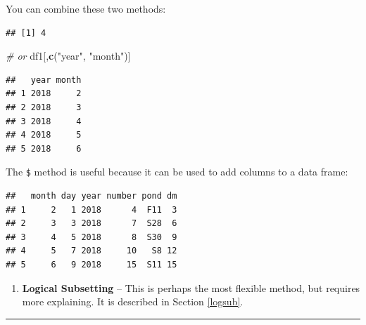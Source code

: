 \documentclass[]{book}
\newenvironment{Shaded}{\begin{snugshade}}{\end{snugshade}}
\newcommand{\KeywordTok}[1]{\textcolor[rgb]{0.13,0.29,0.53}{\textbf{#1}}}
\newcommand{\DecValTok}[1]{\textcolor[rgb]{0.00,0.00,0.81}{#1}}
\newcommand{\StringTok}[1]{\textcolor[rgb]{0.31,0.60,0.02}{#1}}
\newcommand{\CommentTok}[1]{\textcolor[rgb]{0.56,0.35,0.01}{\textit{#1}}}
\newcommand{\OperatorTok}[1]{\textcolor[rgb]{0.81,0.36,0.00}{\textbf{#1}}}
\newcommand{\NormalTok}[1]{#1}
\providecommand{\tightlist}{%
  \setlength{\itemsep}{0pt}\setlength{\parskip}{0pt}}
\theoremstyle{definition}
\theoremstyle{definition}
\theoremstyle{definition}
\theoremstyle{remark}
\begin{document}
You can combine these two methods:

\begin{Shaded}
\end{Shaded}

\begin{verbatim}
## [1] 4
\end{verbatim}

\begin{Shaded}
\begin{Highlighting}[]
\CommentTok{# or}
\NormalTok{df1[,}\KeywordTok{c}\NormalTok{(}\StringTok{"year"}\NormalTok{, }\StringTok{"month"}\NormalTok{)]}
\end{Highlighting}
\end{Shaded}

\begin{verbatim}
##   year month
## 1 2018     2
## 2 2018     3
## 3 2018     4
## 4 2018     5
## 5 2018     6
\end{verbatim}

The \texttt{\$} method is useful because it can be used to add columns
to a data frame:

\begin{Shaded}
\end{Shaded}

\begin{verbatim}
##   month day year number pond dm
## 1     2   1 2018      4  F11  3
## 2     3   3 2018      7  S28  6
## 3     4   5 2018      8  S30  9
## 4     5   7 2018     10   S8 12
## 5     6   9 2018     15  S11 15
\end{verbatim}

\begin{enumerate}
\def\labelenumi{\arabic{enumi}.}
\setcounter{enumi}{2}
\tightlist
\item
  \textbf{Logical Subsetting} -- This is perhaps the most flexible
  method, but requires more explaining. It is described in Section
  \ref{logsub}.
\end{enumerate}

\begin{center}\rule{0.5\linewidth}{\linethickness}\end{center}
\end{document}

